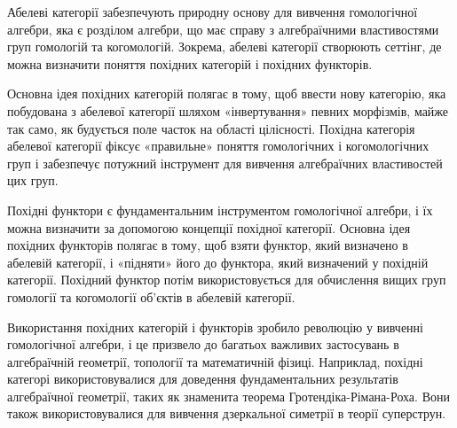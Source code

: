 Абелеві категорії забезпечують природну основу для вивчення
гомологічної алгебри, яка є розділом алгебри, що має справу
з алгебраїчними властивостями груп гомологій та когомологій.
Зокрема, абелеві категорії створюють сеттінг, де можна визначити
поняття похідних категорій і похідних функторів.

Основна ідея похідних категорій полягає в тому, щоб ввести нову
категорію, яка побудована з абелевої категорії шляхом «інвертування»
певних морфізмів, майже так само, як будується поле часток на області
цілісності. Похідна категорія абелевої категорії фіксує «правильне»
поняття гомологічних і когомологічних груп і забезпечує потужний
інструмент для вивчення алгебраїчних властивостей цих груп.

Похідні функтори є фундаментальним інструментом гомологічної
алгебри, і їх можна визначити за допомогою концепції похідної
категорії. Основна ідея похідних функторів полягає в тому, щоб
взяти функтор, який визначено в абелевій категорії, і «підняти»
його до функтора, який визначений у похідній категорії. Похідний
функтор потім використовується для обчислення вищих груп гомології
та когомології об’єктів в абелевій категорії.

Використання похідних категорій і функторів зробило революцію у
вивченні гомологічної алгебри, і це призвело до багатьох важливих
застосувань в алгебраїчній геометрії, топології та математичній
фізиці. Наприклад, похідні категорі використовувалися для доведення
фундаментальних результатів алгебраїчної геометрії, таких як
знаменита теорема Гротендіка-Рімана-Роха. Вони також використовувалися
для вивчення дзеркальної симетрії в теорії суперструн.
